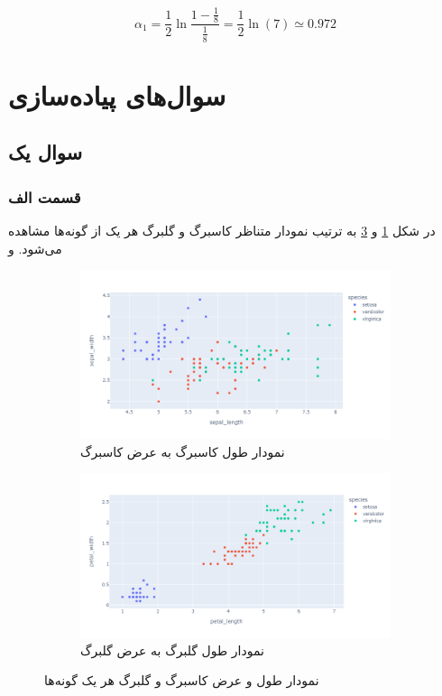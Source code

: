 \documentclass{article}
\begin{document}
$$\alpha_1 = \frac{1}{2} \ln\frac{1-\frac{1}{8}}{\frac{1}{8}}=\frac{1}{2} \ln(7) \simeq 0.972$$

\newpage
\section*{سوال‌های پیاده‌سازی}

\subsection*{سوال یک}

\subsubsection*{قسمت الف}

در شکل \ref{sepal} و \ref{petal} به ترتیب نمودار متناظر کاسبرگ و گلبرگ هر یک از گونه‌ها مشاهده می‌شود. و

\begin{figure}[h]
    \begin{subfigure}{0.45\textwidth}
        \centering
        \includegraphics[scale=.15]{images/implementation/q1/sepal.png}
        \caption{نمودار طول کاسبرگ به عرض کاسبرگ}
        \label{sepal}
    \end{subfigure}
    \hfill
    \begin{subfigure}{0.45\textwidth}
        \centering
        \includegraphics[scale=.15]{images/implementation/q1/petal.png}
        \caption{نمودار طول گلبرگ به عرض گلبرگ}
        \label{petal}
    \end{subfigure}
    \caption{نمودار طول و عرض کاسبرگ و گلبرگ هر یک گونه‌ها}
\end{figure}
\end{document}
